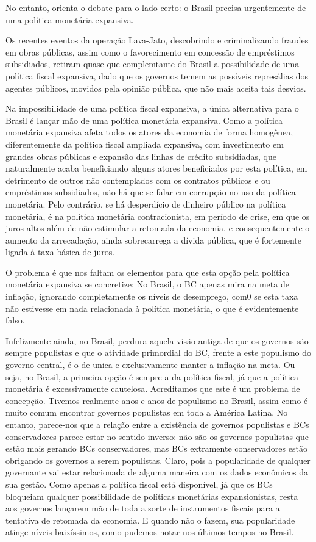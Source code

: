 \documentclass[
	10pt,				%
	openright,			%
	twoside,			%
	a5paper,			%
	english,			%
	french,				%
	spanish,			%
	brazil				%
	]{abntex2}
\begin{document}
No entanto,  orienta o debate para o lado
certo: o Brasil precisa urgentemente de uma política monetária
expansiva.

Os recentes eventos da operação Lava-Jato, descobrindo e criminalizando
fraudes em obras públicas, assim como o favorecimento em concessão de
empréstimos subsidiados, retiram quase que complemtante do Brasil a
possibilidade de uma política fiscal expansiva, dado que os governos
temem as possíveis represálias dos agentes públicos, movidos pela
opinião pública, que não mais aceita tais desvios.

Na impossibilidade de uma política fiscal expansiva, a única alternativa
para o Brasil é lançar mão de uma política monetária expansiva. Como a
política monetária expansiva afeta todos os atores da economia de forma
homogênea, diferentemente da política fiscal ampliada expansiva, com
investimento em grandes obras públicas e expansão das linhas de crédito
subsidiadas, que naturalmente acaba beneficiando alguns atores
beneficiados por esta política, em detrimento de outros não contemplados
com os contratos públicos e ou empréstimos subsidiados, não há que se
falar em corrupção no uso da política monetária. Pelo contrário, se há
desperdício de dinheiro público na política monetária, é na política
monetária contracionista, em período de crise, em que os juros altos
além de não estimular a retomada da economia, e consequentemente o
aumento da arrecadação, ainda sobrecarrega a dívida pública, que é
fortemente ligada à taxa básica de juros.

O problema é que nos faltam os elementos para que esta opção pela
política monetária expansiva se concretize: No Brasil, o BC apenas mira
na meta de inflação, ignorando completamente os níveis de desemprego,
com0 se esta taxa não estivesse em nada relacionada à política
monetária, o que é evidentemente falso.

Infelizmente ainda, no Brasil, perdura aquela visão antiga de que os
governos são sempre populistas e que o atividade primordial do BC,
frente a este populismo do governo central, é o de unica e
exclusivamente manter a inflação na meta. Ou seja, no Brasil, a primeira
opção é sempre a da política fiscal, já que a política monetária é
excessivamente cautelosa. Acreditamos que este é um problema de
concepção. Tivemos realmente anos e anos de populismo no Brasil, assim
como é muito comum encontrar governos populistas em toda a América
Latina. No entanto, parece-nos que a relação entre a existẽncia de
governos populistas e BCs conservadores parece estar no sentido inverso:
não são os governos populistas que estão mais gerando BCs conservadores,
mas BCs extramente conservadores estão obrigando os governos a serem
populistas. Claro, pois a popularidade de qualquer governante vai estar
relacionada de alguma maneira com os dados econômicos da sua gestão.
Como apenas a política fiscal está disponível, já que os BCs bloqueiam
qualquer possibilidade de políticas monetárias expansionistas, resta aos
governos lançarem mão de toda a sorte de instrumentos fiscais para a
tentativa de retomada da economia. E quando não o fazem, sua
popularidade atinge níveis baixíssimos, como pudemos notar nos últimos
tempos no Brasil.
\end{document}
